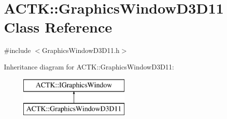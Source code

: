 \hypertarget{class_a_c_t_k_1_1_graphics_window_d3_d11}{\section{A\-C\-T\-K\-:\-:Graphics\-Window\-D3\-D11 Class Reference}
\label{class_a_c_t_k_1_1_graphics_window_d3_d11}
}


{\ttfamily \#include $<$Graphics\-Window\-D3\-D11.\-h$>$}

Inheritance diagram for A\-C\-T\-K\-:\-:Graphics\-Window\-D3\-D11\-:\begin{figure}[H]
\begin{center}
\leavevmode
\includegraphics[height=2.000000cm]{class_a_c_t_k_1_1_graphics_window_d3_d11}
\end{center}
\end{figure}
